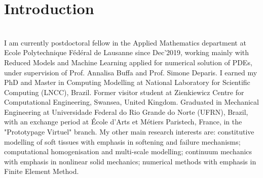 \documentclass[letterpaper]{twentysecondcv} %
\begin{document}
\section{Introduction} \\
I am currently postdoctoral fellow in the Applied Mathematics department at Ecole Polytechnique Fédéral de Lausanne since Dec'2019, working mainly with Reduced Models and Machine Learning applied for numerical solution of PDEs, under supervision of Prof. Annalisa Buffa and Prof. Simone Deparis. I earned my PhD and Master in Computing Modelling at National Laboratory for Scientific Computing (LNCC), Brazil. Former visitor student at Zienkiewicz Centre for Computational Engineering, Swansea, United Kingdom. Graduated in Mechanical Engineering at Universidade Federal do Rio Grande do Norte (UFRN), Brazil, with an exchange period at École d'Arts et Métiers Paristech, France, in the "Prototypage Virtuel" branch. My other main research interests are: constitutive modelling of soft tissues with emphasis in softening and failure mechanisms; computational homogenisation and multi-scale modelling; continuum mechanics with emphasis in nonlinear solid mechanics; numerical methods with emphasis in Finite Element Method.



\end{document}
